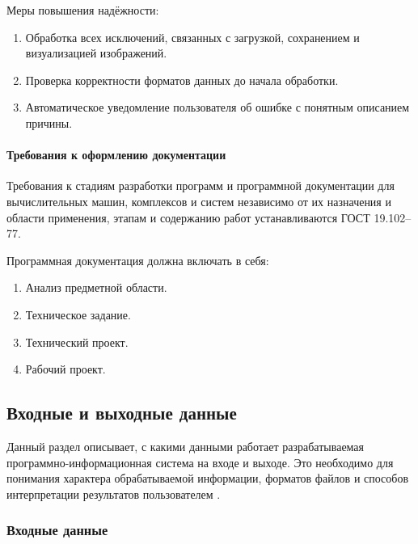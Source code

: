 Меры повышения надёжности:
\begin{enumerate}
	\item Обработка всех исключений, связанных с загрузкой, сохранением и визуализацией изображений.
	\item Проверка корректности форматов данных до начала обработки.
	\item Автоматическое уведомление пользователя об ошибке с понятным описанием причины.
\end{enumerate}
\paragraph{Требования к оформлению документации}

Требования к стадиям разработки программ и программной документации для вычислительных машин, комплексов и систем независимо от их назначения и области применения, этапам и содержанию работ устанавливаются ГОСТ 19.102–77.

Программная документация должна включать в себя:
\begin{enumerate}
	\item Анализ предметной области.
	\item Техническое задание.
	\item Технический проект.
	\item Рабочий проект.	
\end{enumerate}
\subsection{Входные и выходные данные}

Данный раздел описывает, с какими данными работает разрабатываемая программно-информационная система на входе и выходе. Это необходимо для понимания характера обрабатываемой информации, форматов файлов и способов интерпретации результатов пользователем \cite{dawson2021}.
\subsubsection{Входные данные}

